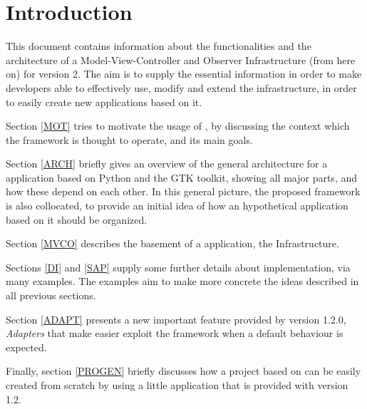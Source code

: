 \section{Introduction}

This document contains information about the functionalities and the
architecture of a Model-View-Controller and Observer Infrastructure
(\mvco from here on) for \pygtk version 2. The aim is to supply the
essential information in order to make developers able to effectively
use, modify and extend the infrastructure, in order to easily create
new applications based on it.

\bigskip

Section \ref{MOT} tries to motivate the usage of \pygtkmvc, by
discussing the context which the framework is thought to operate, and
its main goals.

Section \ref{ARCH} briefly gives an overview of the general
architecture for a \gui application based on Python and the GTK
toolkit, showing all major parts, and how these depend on each other.
In this general picture, the proposed \mvco framework is also
collocated, to provide an initial idea of how an hypothetical
application based on it should be organized.

Section \ref{MVCO} describes the basement of a \gui application, the
\mvco Infrastructure. 

Sections \ref{DI} and \ref{SAP} supply some further details
about implementation, via many examples. The examples aim to make more
concrete the ideas described in all previous sections.

Section \ref{ADAPT} presents a new important feature provided by
version 1.2.0, \emph{Adapters} that make easier exploit the
framework when a default behaviour is expected. 

Finally, section \ref{PROGEN} briefly discusses how a project based
on \mvco can be easily created from scratch by using a little
application that is provided with version 1.2.
